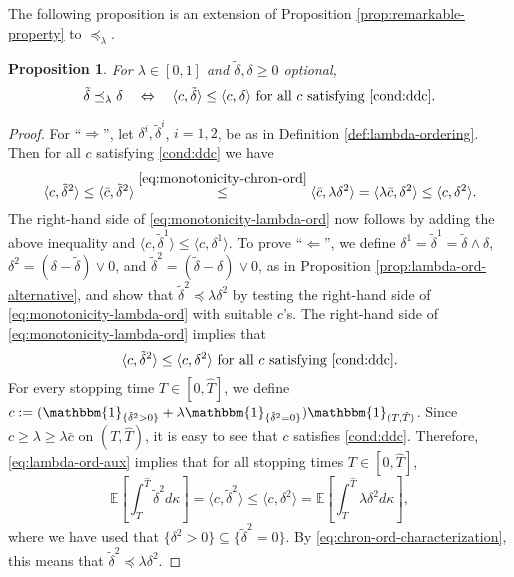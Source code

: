 \documentclass[11pt, oneside]{article}   	%
\theoremstyle{plain}
\newtheorem{prop}[thm]{Proposition}
\theoremstyle{definition}
\theoremstyle{remark}
\begin{document}
The following proposition is an extension of Proposition \ref{prop:remarkable-property} to $\preceq_\lambda$.
\begin{prop}
For $\lambda\in[0,1]$ and $\tilde\delta,\delta\geq 0$ optional,
\begin{equation}\label{eq:monotonicity-lambda-ord}
\tilde{\delta}\preceq_\lambda\delta\quad \Leftrightarrow\quad \langle c,\tilde{\delta}\rangle\leq\langle c,\delta \rangle\text{ for all }c\text{ satisfying \eqref{cond:ddc}}.
\end{equation}
\end{prop}
\begin{proof}
For ``$\Rightarrow$'', let $\delta^i,\tilde\delta^i$, $i=1,2$, be as in Definition \ref{def:lambda-ordering}. Then for all $c$ satisfying \eqref{cond:ddc} we have
\begin{equation*}
\langle c,\tilde\delta^2 \rangle\leq\langle \bar{c},\tilde\delta^2 \rangle\overset{\eqref{eq:monotonicity-chron-ord}}{\leq}\langle \bar{c},\lambda\delta^2 \rangle=\langle\lambda\bar{c},\delta^2\rangle\leq\langle c,\delta^2 \rangle.
\end{equation*}
The right-hand side of \eqref{eq:monotonicity-lambda-ord} now follows by adding the above inequality and $\langle c,\tilde\delta^1 \rangle\leq\langle c,\delta^1 \rangle$. To prove ``$\Leftarrow$'', we define $\delta^1=\tilde\delta^1=\tilde\delta\wedge\delta$, $\delta^2=(\delta-\tilde\delta)\vee 0$, and $\tilde\delta^2=(\tilde\delta-\delta)\vee 0$, as in Proposition \ref{prop:lambda-ord-alternative}, and show that $\tilde\delta^2\preceq\lambda\delta^2$ by testing the right-hand side of \eqref{eq:monotonicity-lambda-ord} with suitable $c$'s. The right-hand side of \eqref{eq:monotonicity-lambda-ord} implies that
\begin{equation}\label{eq:lambda-ord-aux}
\langle c,\tilde\delta^2\rangle\leq\langle c,\delta^2 \rangle\text{ for all }c\text{ satisfying \eqref{cond:ddc}}.
\end{equation}
For every stopping time $T\in[0,{\hat{T}}]$, we define $c:=(\mathbbm{1}_{\{\tilde\delta^2>0\}}+\lambda\mathbbm{1}_{\{\tilde\delta^2=0\}})\mathbbm{1}_{(T,{\hat{T}})}$. Since $c\geq\lambda\geq\lambda\bar{c}$ on $(T,{\hat{T}})$, it is easy to see that $c$ satisfies \eqref{cond:ddc}. Therefore, \eqref{eq:lambda-ord-aux} implies that for all stopping times $T\in[0,{\hat{T}}]$,
$$\mathbb{E}\left[\int_T^{\hat{T}} \tilde\delta^2d\kappa\right]=\langle c,\tilde\delta^2\rangle\leq \langle c,\delta^2\rangle=\mathbb{E}\left[\int_T^{\hat{T}} \lambda\delta^2 d\kappa\right],$$
where we have used that $\{\delta^2>0\}\subseteq\{\tilde\delta^2=0\}$. By \eqref{eq:chron-ord-characterization}, this means that $\tilde\delta^2\preceq\lambda\delta^2$.
\end{proof}
\end{document}
